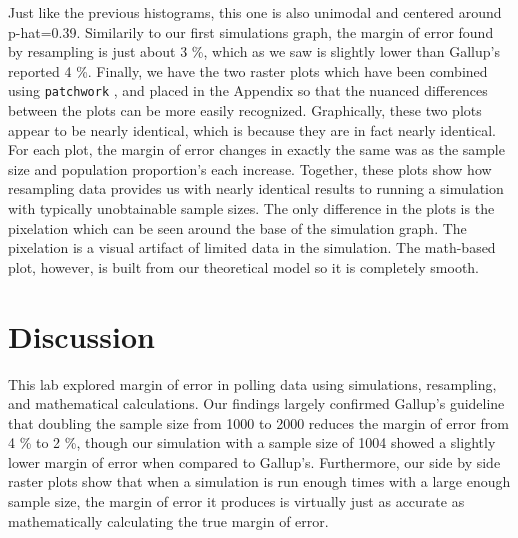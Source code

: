 \documentclass{article}\usepackage[]{graphicx}\usepackage[]{xcolor}
\begin{document}
\begin{multicols}{2}
\indent 
Just like the previous histograms, this one is also unimodal and centered around p-hat=0.39. Similarily to our first simulations graph, the margin of error found by resampling is just about 3 \%, which as we saw is slightly lower than Gallup's reported 4 \%.
\newline
\indent
Finally, we have the two raster plots which have been combined using \texttt{patchwork} \citep{patchwork}, and placed in the Appendix so that the nuanced differences between the plots can be more easily recognized. Graphically, these two plots appear to be nearly identical, which is because they are in fact nearly identical. For each plot, the margin of error changes in exactly the same was as the sample size and population proportion's each increase. Together, these plots show how resampling data provides us with nearly identical results to running a simulation with typically unobtainable sample sizes. The only difference in the plots is the pixelation which can be seen around the base of the simulation graph. The pixelation is a visual artifact of limited data in the simulation. The math-based plot, however, is built from our theoretical model so it is completely smooth.


\section{Discussion}
This lab explored margin of error in polling data using simulations, resampling, and mathematical calculations. Our findings largely confirmed Gallup's guideline that doubling the sample size from 1000 to 2000 reduces the margin of error from 4 \% to 2 \%, though our simulation with a sample size of 1004 showed a slightly lower margin of error when compared to Gallup's. Furthermore, our side by side raster plots show that when a simulation is run enough times with a large enough sample size, the margin of error it produces is virtually just as accurate as mathematically calculating the true margin of error. 




\vspace{2em}


\nocite{patchwork}
\nocite{tidyverse}

\begin{tiny}

\end{tiny}
\end{multicols}
\end{document}
